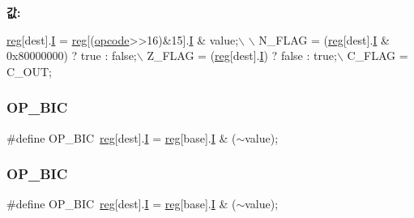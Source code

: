 {\bfseries 값\+:}
\begin{DoxyCode}
\mbox{\hyperlink{_g_b_a_8h_ae29faba89509024ffd1a292badcedf2d}{reg}}[dest].\mbox{\hyperlink{unionreg__pair_a9f6a42d56c07829d7013571eda998252}{I}} = \mbox{\hyperlink{_g_b_a_8h_ae29faba89509024ffd1a292badcedf2d}{reg}}[(\mbox{\hyperlink{arm-new_8h_a4fc220098f4b9d0e039a28274d05c198}{opcode}}>>16)&15].\mbox{\hyperlink{arm-new_8h_a782b7c7c9a56a2031f6270eac7f000d6}{I}} & value;\(\backslash\)
      \(\backslash\)
      N\_FLAG = (\mbox{\hyperlink{_g_b_a_8h_ae29faba89509024ffd1a292badcedf2d}{reg}}[dest].\mbox{\hyperlink{unionreg__pair_a9f6a42d56c07829d7013571eda998252}{I}} & 0x80000000) ? \textcolor{keyword}{true} : \textcolor{keyword}{false};\(\backslash\)
      Z\_FLAG = (\mbox{\hyperlink{_g_b_a_8h_ae29faba89509024ffd1a292badcedf2d}{reg}}[dest].\mbox{\hyperlink{unionreg__pair_a9f6a42d56c07829d7013571eda998252}{I}}) ? \textcolor{keyword}{false} : \textcolor{keyword}{true};\(\backslash\)
      C\_FLAG = C\_OUT;
\end{DoxyCode}
\mbox{\label{_g_b_a_8cpp_a9421adf153ebdde8ec8e42d15fb17489}} 
\subsubsection{\texorpdfstring{O\+P\+\_\+\+B\+IC}{OP\_BIC}\hspace{0.1cm}{\footnotesize\ttfamily [1/2]}}
{\footnotesize\ttfamily \#define O\+P\+\_\+\+B\+IC~\mbox{\hyperlink{_globals_8h_ae29faba89509024ffd1a292badcedf2d}{reg}}\mbox{[}dest\mbox{]}.\mbox{\hyperlink{thumb_8h_a782b7c7c9a56a2031f6270eac7f000d6}{I}} = \mbox{\hyperlink{_globals_8h_ae29faba89509024ffd1a292badcedf2d}{reg}}\mbox{[}base\mbox{]}.\mbox{\hyperlink{thumb_8h_a782b7c7c9a56a2031f6270eac7f000d6}{I}} \& ($\sim$value);}

\mbox{\label{arm-new_8h_a9421adf153ebdde8ec8e42d15fb17489}} 
\subsubsection{\texorpdfstring{O\+P\+\_\+\+B\+IC}{OP\_BIC}\hspace{0.1cm}{\footnotesize\ttfamily [2/2]}}
{\footnotesize\ttfamily \#define O\+P\+\_\+\+B\+IC~\mbox{\hyperlink{_globals_8h_ae29faba89509024ffd1a292badcedf2d}{reg}}\mbox{[}dest\mbox{]}.\mbox{\hyperlink{thumb_8h_a782b7c7c9a56a2031f6270eac7f000d6}{I}} = \mbox{\hyperlink{_globals_8h_ae29faba89509024ffd1a292badcedf2d}{reg}}\mbox{[}base\mbox{]}.\mbox{\hyperlink{thumb_8h_a782b7c7c9a56a2031f6270eac7f000d6}{I}} \& ($\sim$value);}



